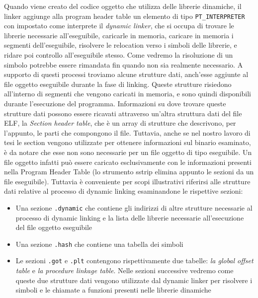 Quando viene creato del codice oggetto che utilizza delle librerie
dinamiche, il linker aggiunge alla program header table un elemento di
tipo \lstinline{PT_INTERPRETER} con impostato come interprete il
\emph{dynamic linker}, che si occupa di trovare le librerie necessarie
all'eseguibile, caricarle in memoria, caricare in memoria i segmenti
dell'eseguibile, risolvere le relocation verso i simboli delle
librerie, e ridare poi controllo all'eseguibile stesso. Come vedremo
la risoluzione di un simbolo potrebbe essere rimandata fin quando non
sia realmente necessario. A supporto di questi processi troviamo
alcune strutture dati, anch'esse aggiunte al file oggetto eseguibile
durante la fase di linking. Queste strutture risiedono all'interno di
segmenti che vengono caricati in memoria, e sono quindi disponibili
durante l'esecuzione del programma. Informazioni su dove trovare
queste strutture dati possono essere ricavati attraverso un'altra
struttura dati del file ELF, la \emph{Section header table}, che è un
array di strutture che descrivono, per l'appunto, le parti che
compongono il file. Tuttavia, anche se nel nostro lavoro di tesi le
section vengono utilizzate per ottenere informazioni sul binario
esaminato, è da notare che esse non sono necessarie per un file
oggetto di tipo eseguibile. Un file oggetto infatti può essere
caricato esclusivamente con le informazioni presenti nella Program
Header Table (lo strumento sstrip\cite{sstrip} elimina appunto le
sezioni da un file eseguibile). Tuttavia è conveniente per scopi
illustrativi riferirsi alle strutture dati relative al processo di
dynamic linking esaminandone le rispettive sezioni:

\begin{itemize}

  \item Una sezione \lstinline{.dynamic} che contiene gli indirizzi di
    altre strutture necessarie al processo di dynamic linking e la
    lista delle librerie necessarie all'esecuzione del file oggetto
    eseguibile

  \item Una sezione \lstinline{.hash} che contiene una tabella dei
    simboli

  \item Le sezioni \lstinline{.got} e \lstinline{.plt} contengono
    rispettivamente due tabelle: \emph{la global offset table} e
    \emph{la procedure linkage table}. Nelle sezioni successive
    vedremo come queste due strutture dati vengono utilizzate dal
    dynamic linker per risolvere i simboli e le chiamate a funzioni
    presenti nelle librerie dinamiche

\end{itemize}

